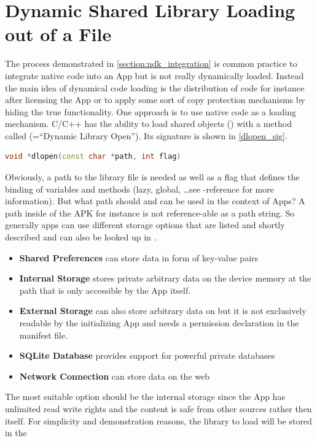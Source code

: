 \section{Dynamic Shared Library Loading out of a File}\label{section:shared_library_loading}
The process demonstrated in \autoref{section:ndk_integration} is common practice to
integrate native code into an App but is not really dynamically loaded. Instead
the main idea of dynamical code loading is the distribution of code for instance
after licensing the App or to apply some sort of copy protection mechanisms by hiding
the true functionality. One approach is to use native code as a loading mechanism.
C/C++ has the ability to load shared objects () with a method called
 (=``Dynamic Library Open''). Its signature is shown in \autoref{dlopen_sig}.
\begin{lstlisting}[language=C++, caption=dlopen() Signature, label=dlopen_sig]
void *dlopen(const char *path, int flag)
\end{lstlisting}
Obviously, a path to the library file is needed as well as a flag that defines the binding of variables and methods (lazy, global, \ldots see -reference for more information).
But what path should and can be used in the context of Apps? A path inside of the APK
for instance is not reference-able as a path string. So generally apps can use different storage options that are listed and shortly described and can also be looked up in
\parencite{storage_options}.
\begin{itemize}
\item \textbf{Shared Preferences} can store data in form of key-value pairs
\item \textbf{Internal Storage} stores private arbitrary data on the device memory at the path
  that is only accessible by the App itself.
\item \textbf{External Storage} can also store arbitrary data on  but it is not exclusively readable by the initializing App and needs a permission declaration in
the manifest file.
\item \textbf{SQLite Database} provides support for powerful private databases
\item \textbf{Network Connection} can store data on the web
\end{itemize}
The most suitable option should be the internal storage since the App has unlimited read
write rights and the content is safe from other sources rather then itself. For simplicity and demonstration reasons, the library to load will be stored in the

